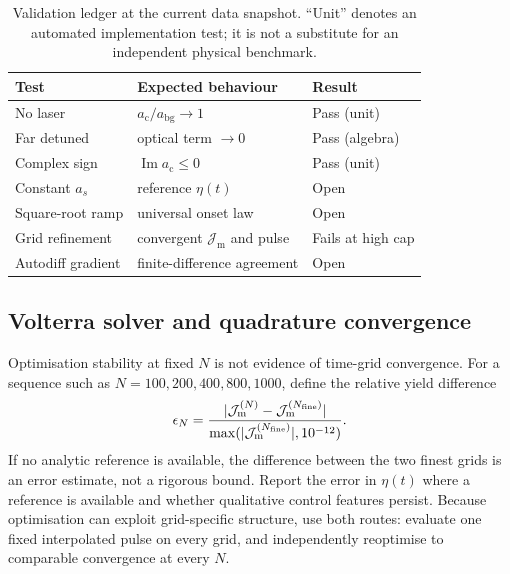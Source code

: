 \documentclass[9pt,a4paper,twocolumn,twoside]{rho-class/rho}
\newcommand{\ac}{a_{\mathrm{c}}}
\newcommand{\abg}{a_{\mathrm{bg}}}
\newcommand{\Jmol}{\mathcal{J}_{\mathrm{m}}}
\begin{document}
        \begin{table}[H]
            \caption{Validation ledger at the current data snapshot. ``Unit'' denotes an automated implementation test; it is not a substitute for an independent physical benchmark.}
            \label{tab:validation-matrix}
            \setlength{\tabcolsep}{3pt}
            \begin{tabular}{>{\raggedright\arraybackslash}p{}>{\raggedright\arraybackslash}p{}>{\raggedright\arraybackslash}p{}}
                \toprule
                \textbf{Test} & \textbf{Expected behaviour} & \textbf{Result} \\
                \midrule
                No laser & $\ac/\abg\to1$ & Pass (unit) \\
                Far detuned & optical term $\to0$ & Pass (algebra) \\
                Complex sign & $\operatorname{Im}\ac\leq0$ & Pass (unit) \\
                Constant $a_s$ & reference $\eta(t)$ & Open \\
                Square-root ramp & universal onset law & Open \\
                Grid refinement & convergent $\Jmol$ and pulse & Fails at high cap \\
                Autodiff gradient & finite-difference agreement & Open \\
                \bottomrule
            \end{tabular}
        \end{table}

    \subsection{Volterra solver and quadrature convergence}

        Optimisation stability at fixed $N$ is not evidence of time-grid convergence. For a sequence such as $N=100,200,400,800,1000$, define the relative yield difference
        \begin{equation}\label{eq:grid-error}
            \epsilon_N=
            \frac{|\Jmol^{(N)}-\Jmol^{(N_{\rm fine})}|}
            {\max(|\Jmol^{(N_{\rm fine})}|,10^{-12})}.
        \end{equation}
        If no analytic reference is available, the difference between the two finest grids is an error estimate, not a rigorous bound. Report the error in $\eta(t)$ where a reference is available and whether qualitative control features persist. Because optimisation can exploit grid-specific structure, use both routes: evaluate one fixed interpolated pulse on every grid, and independently reoptimise to comparable convergence at every $N$.
\end{document}
